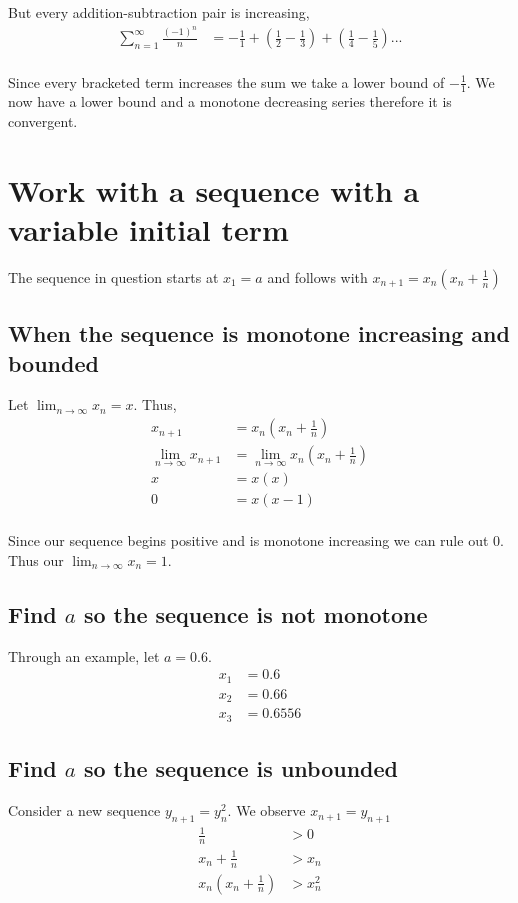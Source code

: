 \documentclass{article}
\begin{document}
But every addition-subtraction pair is increasing,
\begin{align*}
    \sum^\infty_{n=1} \frac{(-1)^n}{n}
    &= -\frac{1}{1} + \left(\frac{1}{2} - \frac{1}{3}\right)
    + \left(\frac{1}{4} - \frac{1}{5}\right) ... \\
\end{align*}

Since every bracketed term increases the sum we take a lower bound of
$-\frac{1}{1}$. We now have a lower
bound and a monotone decreasing series therefore it is convergent.

\section{Work with a sequence with a variable initial term}
The sequence in question starts at $x_1 = a$ and follows with
$x_{n+1} = x_n \left(x_n + \frac{1}{n}\right)$

\subsection{When the sequence is monotone increasing and bounded}
Let $\lim_{n \to \infty} x_n = x$. Thus,
\begin{align*}
    x_{n+1} &= x_n \left(x_n + \frac{1}{n}\right) \\
    \lim_{n \to \infty} x_{n+1}
    &= \lim_{n \to \infty} x_n \left(x_n + \frac{1}{n}\right) \\
    x &= x \left(x\right) \\
    0 &= x(x-1) \\
\end{align*}

Since our sequence begins positive and is monotone increasing we can rule out
$0$. Thus our $\lim_{n \to \infty} x_n = 1$.

\subsection{Find $a$ so the sequence is not monotone}
Through an example, let $a = 0.6$.
\begin{align*}
    x_1 &= 0.6 \\
    x_2 &= 0.66 \\
    x_3 &= 0.6556
\end{align*}

\subsection{Find $a$ so the sequence is unbounded}
Consider a new sequence $y_{n+1} = y_n^2$.
We observe $x_{n+1} = y_{n+1}$
\begin{align*}
    \frac{1}{n} &> 0 \\
    x_n + \frac{1}{n} &> x_n \\
    x_n\left(x_n + \frac{1}{n}\right) &> x_n^2
\end{align*}
\end{document}
